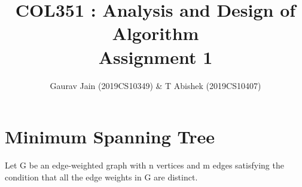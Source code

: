 \documentclass[a4paper]{article}
\begin{document}

\title{\textbf{COL351 : Analysis and Design of Algorithm \\ Assignment 1 }}
\author{Gaurav Jain (2019CS10349) \& T Abishek (2019CS10407)}
\date{}

\maketitle
\section{Minimum Spanning Tree}
Let G be an edge-weighted graph with n vertices and m edges satisfying the condition that all the edge weights in G are distinct.
\end{document}
